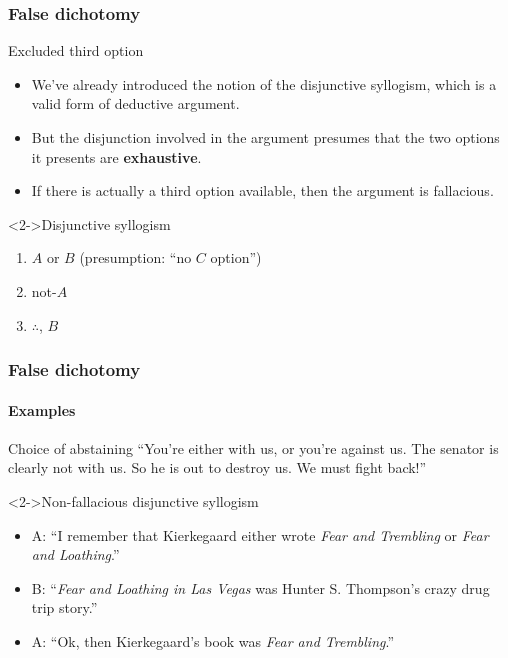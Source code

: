 \documentclass[10pt,letterpaper,xcolor=dvipsnames,handout]{beamer}
\begin{document}
\begin{frame}
  \frametitle{False dichotomy}
  
  \begin{block}{Excluded third option}
    \begin{itemize}
      \item We've already introduced the notion of the disjunctive syllogism, which is a valid form of deductive argument.
      \item But the disjunction involved in the argument presumes that the two options it presents are \textbf{exhaustive}.
      \item If there is actually a third option available, then the argument is fallacious.
    \end{itemize}
  \end{block}
  
  \begin{block}<2->{Disjunctive syllogism}
    \begin{enumerate}
      \item $A$ or $B$ (presumption: ``no $C$ option'')
      \item not-$A$
      \item $\therefore$, $B$
    \end{enumerate}
  \end{block}
  
\end{frame}

\begin{frame}
  \frametitle{False dichotomy}
  \framesubtitle{Examples}
  
  \begin{block}{Choice of abstaining}
    ``You're either with us, or you're against us. The senator is clearly not with us.  So he is out to destroy us.  We must fight back!''
  \end{block}
  
  \begin{block}<2->{Non-fallacious disjunctive syllogism}
    \begin{itemize}
      \item A: ``I remember that Kierkegaard either wrote \textit{Fear and Trembling} or \textit{Fear and Loathing}.''
      \item B: ``\textit{Fear and Loathing in Las Vegas} was Hunter S. Thompson's crazy drug trip story.''
      \item A: ``Ok, then Kierkegaard's book was \textit{Fear and Trembling}.''
    \end{itemize}
  \end{block}
  
\end{frame}
\end{document}
